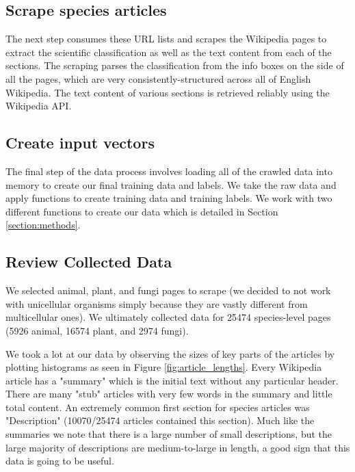 \documentclass[10pt,twocolumn,letterpaper]{article}
\begin{document}
\subsection{Scrape species articles}
The next step consumes these URL lists and scrapes the Wikipedia pages to extract the scientific classification as well as the text content from each of the sections. The scraping parses the classification from the info boxes on the side of all the pages, which are very consistently-structured across all of English Wikipedia. The text content of various sections is retrieved reliably using the Wikipedia API.

\subsection{Create input vectors}
The final step of the data process involves loading all of the crawled data into memory to create our final training data and labels. We take the raw data and apply functions to create training data and training labels. We work with two different functions to create our data which is detailed in Section \ref{section:methods}.

\subsection{Review Collected Data}

We selected animal, plant, and fungi pages to scrape (we decided to not work with unicellular organisms simply because they are vastly different from multicellular ones). We ultimately collected data for 25474 species-level pages (5926 animal, 16574 plant, and 2974 fungi). 

We took a lot at our data by observing the sizes of key parts of the articles by plotting histograms as seen in Figure \ref{fig:article_lengths}. Every Wikipedia article has a "summary" which is the initial text without any particular header. There are many "stub" articles with very few words in the summary and little total content. An extremely common first section for species articles was "Description" (10070/25474 articles contained this section). Much like the summaries we note that there is a large number of small descriptions, but the large majority of descriptions are medium-to-large in length, a good sign that this data is going to be useful.
\end{document}
